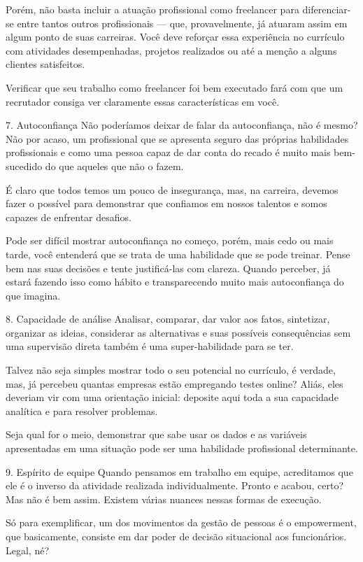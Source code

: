 \begin{commentA}
Porém, não basta incluir a atuação profissional como freelancer para diferenciar-se entre tantos outros profissionais — que, provavelmente, já atuaram assim em algum ponto de suas carreiras. Você deve reforçar essa experiência no currículo com atividades desempenhadas, projetos realizados ou até a menção a alguns clientes satisfeitos.

Verificar que seu trabalho como freelancer foi bem executado fará com que um recrutador consiga ver claramente essas características em você.

7. Autoconfiança
Não poderíamos deixar de falar da autoconfiança, não é mesmo? Não por acaso, um profissional que se apresenta seguro das próprias habilidades profissionais e como uma pessoa capaz de dar conta do recado é muito mais bem-sucedido do que aqueles que não o fazem.

É claro que todos temos um pouco de insegurança, mas, na carreira, devemos fazer o possível para demonstrar que confiamos em nossos talentos e somos capazes de enfrentar desafios.

Pode ser difícil mostrar autoconfiança no começo, porém, mais cedo ou mais tarde, você entenderá que se trata de uma habilidade que se pode treinar. Pense bem nas suas decisões e tente justificá-las com clareza. Quando perceber, já estará fazendo isso como hábito e transparecendo muito mais autoconfiança do que imagina.

8. Capacidade de análise
Analisar, comparar, dar valor aos fatos, sintetizar, organizar as ideias, considerar as alternativas e suas possíveis consequências sem uma supervisão direta também é uma super-habilidade para se ter.

Talvez não seja simples mostrar todo o seu potencial no currículo, é verdade, mas, já percebeu quantas empresas estão empregando testes online? Aliás, eles deveriam vir com uma orientação inicial: deposite aqui toda a sua capacidade analítica e para resolver problemas.

Seja qual for o meio, demonstrar que sabe usar os dados e as variáveis apresentadas em uma situação pode ser uma habilidade profissional determinante.

9. Espírito de equipe
Quando pensamos em trabalho em equipe, acreditamos que ele é o inverso da atividade realizada individualmente. Pronto e acabou, certo? Mas não é bem assim. Existem várias nuances nessas formas de execução.

Só para exemplificar, um dos movimentos da gestão de pessoas é o empowerment, que basicamente, consiste em dar poder de decisão situacional aos funcionários. Legal, né?


\end{commentA}
